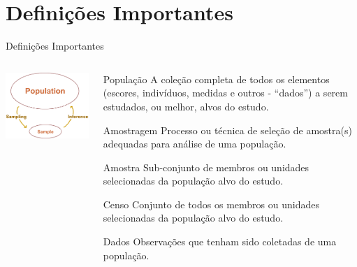 \documentclass{bredelebeamer}
\begin{document}
\section{Definições Importantes}

\begin{frame}{Definições Importantes}
\begin{columns}
\begin{column}{0.3\textwidth}
\begin{center}
\includegraphics[scale=0.3]{images/population.png}
\end{center}
\end{column}

\begin{column}{0.7\textwidth}
\begin{block}{População}
  \footnotesize{A coleção completa de todos os elementos (escores, indivíduos,
    medidas e outros - ``dados'') a serem estudados, ou melhor, alvos do
    estudo.}
\end{block}

\begin{exampleblock}{Amostragem}
  \footnotesize{Processo ou técnica de seleção de amostra(s) adequadas
    para análise de uma população.}
\end{exampleblock}

\begin{alertblock}{Amostra}
  \footnotesize{Sub-conjunto de membros ou unidades selecionadas da população alvo do
    estudo.}
\end{alertblock}

\begin{block}{Censo}
  \footnotesize{Conjunto de todos os membros ou unidades selecionadas da
  população alvo do estudo.}
\end{block}

\begin{exampleblock}{Dados}
  \footnotesize{Observações que tenham sido coletadas de uma população.}
\end{exampleblock}

\end{column}
\end{columns}
\end{frame}
\end{document}
